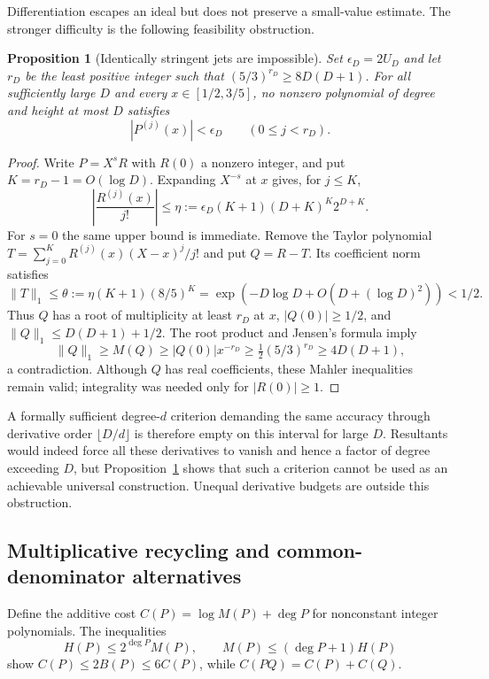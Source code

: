 \documentclass[11pt,a4paper]{article}
\newtheorem{proposition}[theorem]{Proposition}
\theoremstyle{definition}
\theoremstyle{remark}
\numberwithin{equation}{section}
\begin{document}
Differentiation escapes an ideal but does not preserve a small-value estimate. The stronger difficulty is the following feasibility obstruction.
\begin{proposition}[Identically stringent jets are impossible]\label{inf:prop:jet-obstruction}
Set $\epsilon_D=2U_D$ and let $r_D$ be the least positive integer such that $(5/3)^{r_D}\ge8D(D+1)$. For all sufficiently large $D$ and every $x\in[1/2,3/5]$, no nonzero polynomial of degree and height at most $D$ satisfies
\[
 |P^{(j)}(x)|<\epsilon_D\qquad(0\le j<r_D).
\]
\end{proposition}
\begin{proof}
Write $P=X^sR$ with $R(0)$ a nonzero integer, and put $K=r_D-1=O(\log D)$. Expanding $X^{-s}$ at $x$ gives, for $j\le K$,
\[
 \left|\frac{R^{(j)}(x)}{j!}\right|
 \le\eta:=\epsilon_D(K+1)(D+K)^K2^{D+K}.
\]
For $s=0$ the same upper bound is immediate. Remove the Taylor polynomial $T=\sum_{j=0}^K R^{(j)}(x)(X-x)^j/j!$ and put $Q=R-T$. Its coefficient norm satisfies
\[
 \|T\|_1\le\theta:=\eta(K+1)(8/5)^K
 =\exp(-D\log D+O(D+(\log D)^2))<1/2.
\]
Thus $Q$ has a root of multiplicity at least $r_D$ at $x$, $|Q(0)|\ge1/2$, and $\|Q\|_1\le D(D+1)+1/2$. The root product and Jensen's formula imply
\[
 \|Q\|_1\ge M(Q)\ge |Q(0)|x^{-r_D}
 \ge\tfrac12(5/3)^{r_D}\ge4D(D+1),
\]
a contradiction. Although $Q$ has real coefficients, these Mahler inequalities remain valid; integrality was needed only for $|R(0)|\ge1$.
\end{proof}

A formally sufficient degree-$d$ criterion demanding the same accuracy through derivative order $\lfloor D/d\rfloor$ is therefore empty on this interval for large $D$. Resultants would indeed force all these derivatives to vanish and hence a factor of degree exceeding $D$, but Proposition~\ref{inf:prop:jet-obstruction} shows that such a criterion cannot be used as an achievable universal construction. Unequal derivative budgets are outside this obstruction.

\subsection{Multiplicative recycling and common-denominator alternatives}
\label{inf:sub:products}
Define the additive cost $C(P)=\log M(P)+\deg P$ for nonconstant integer polynomials. The inequalities
\[
 H(P)\le2^{\deg P}M(P),\qquad M(P)\le(\deg P+1)H(P)
\]
show $C(P)\le2B(P)\le6C(P)$, while $C(PQ)=C(P)+C(Q)$.
\end{document}
